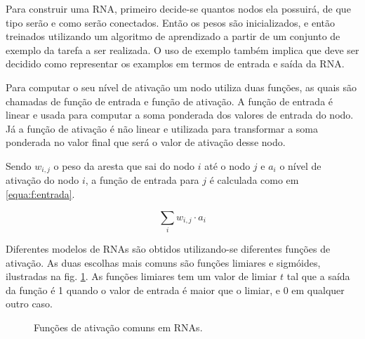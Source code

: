 Para construir uma RNA, primeiro decide-se quantos nodos ela possuirá, de que tipo serão e como serão conectados. Então os pesos são inicializados, e então treinados utilizando um algoritmo de aprendizado a partir de um conjunto de exemplo da tarefa a ser realizada. O uso de exemplo também implica que deve ser decidido como representar os examplos em termos de entrada e saída da RNA.

Para computar o seu nível de ativação um nodo utiliza duas funções, as quais são chamadas de função de entrada e função de ativação. A função de entrada é linear e usada para computar a soma ponderada dos valores de entrada do nodo. Já a função de ativação é não linear e utilizada para transformar a soma ponderada no valor final que será o valor de ativação desse nodo.

Sendo $w_{i,j}$ o peso da aresta que sai do nodo $i$ até o nodo $j$ e $a_i$ o nível de ativação do nodo $i$, a função de entrada para $j$ é calculada como em \ref{equa:f:entrada}.

\begin{equation}
	\sum_{i} w_{i,j} \cdot a_i
	\label{equa:f:entrada}
\end{equation}

Diferentes modelos de RNAs são obtidos utilizando-se diferentes funções de ativação. As duas escolhas mais comuns são funções limiares e sigmóides, ilustradas na fig. \ref{fig:func:rna}. As funções limiares tem um valor de limiar $t$ tal que a saída da função é 1 quando o valor de entrada é maior que o limiar, e 0 em qualquer outro caso.

\begin{figure}[ht]
 \begin{center}
 \end{center}
 \caption{Funções de ativação comuns em RNAs.}
 \label{fig:func:rna}
\end{figure}

